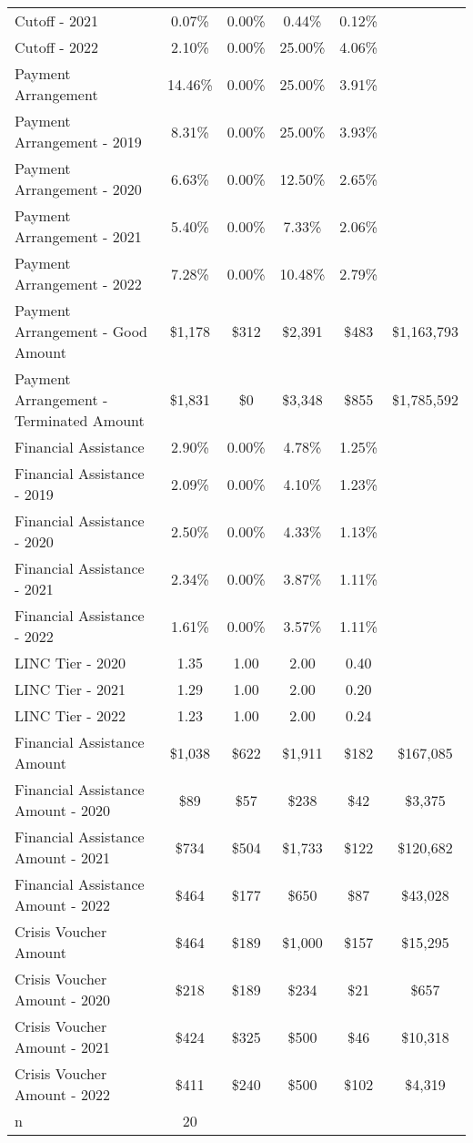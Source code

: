 \begin{tabular}{l|c|c|c|c|c}
\quad Cutoff - 2021 & 0.07\% & 0.00\% & 0.44\% & 0.12\% \\
\quad Cutoff - 2022 & 2.10\% & 0.00\% & 25.00\% & 4.06\% \\
\midrule 
Payment Arrangement & 14.46\% & 0.00\% & 25.00\% & 3.91\% \\
\quad Payment Arrangement - 2019 & 8.31\% & 0.00\% & 25.00\% & 3.93\% \\
\quad Payment Arrangement - 2020 & 6.63\% & 0.00\% & 12.50\% & 2.65\% \\
\quad Payment Arrangement - 2021 & 5.40\% & 0.00\% & 7.33\% & 2.06\% \\
\quad Payment Arrangement - 2022 & 7.28\% & 0.00\% & 10.48\% & 2.79\% \\
\quad Payment Arrangement - Good Amount & \$1,178 & \$312 & \$2,391 & \$483 & \$1,163,793 \\
\quad Payment Arrangement - Terminated Amount & \$1,831 & \$0 & \$3,348 & \$855 & \$1,785,592 \\
\midrule 
Financial Assistance & 2.90\% & 0.00\% & 4.78\% & 1.25\% \\
\quad Financial Assistance - 2019 & 2.09\% & 0.00\% & 4.10\% & 1.23\% \\
\quad Financial Assistance - 2020 & 2.50\% & 0.00\% & 4.33\% & 1.13\% \\
\quad Financial Assistance - 2021 & 2.34\% & 0.00\% & 3.87\% & 1.11\% \\
\quad Financial Assistance - 2022 & 1.61\% & 0.00\% & 3.57\% & 1.11\% \\
\midrule 
LINC Tier - 2020 & 1.35 & 1.00 & 2.00 & 0.40 \\
LINC Tier - 2021 & 1.29 & 1.00 & 2.00 & 0.20 \\
LINC Tier - 2022 & 1.23 & 1.00 & 2.00 & 0.24 \\
\midrule 
Financial Assistance Amount & \$1,038 & \$622 & \$1,911 & \$182 & \$167,085 \\
\quad Financial Assistance Amount - 2020 & \$89 & \$57 & \$238 & \$42 & \$3,375 \\
\quad Financial Assistance Amount - 2021 & \$734 & \$504 & \$1,733 & \$122 & \$120,682 \\
\quad Financial Assistance Amount - 2022 & \$464 & \$177 & \$650 & \$87 & \$43,028 \\
\midrule 
Crisis Voucher Amount & \$464 & \$189 & \$1,000 & \$157 & \$15,295 \\
\quad Crisis Voucher Amount - 2020 & \$218 & \$189 & \$234 & \$21 & \$657 \\
\quad Crisis Voucher Amount - 2021 & \$424 & \$325 & \$500 & \$46 & \$10,318 \\
\quad Crisis Voucher Amount - 2022 & \$411 & \$240 & \$500 & \$102 & \$4,319 \\
\midrule 
n & 20 &  &  &  &  \\
\midrule 
\bottomrule 
\end{tabular}
